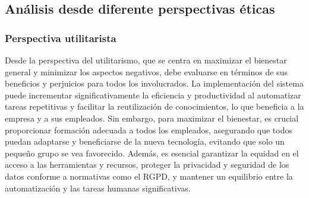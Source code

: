 \subsection{Análisis desde diferente perspectivas éticas}
\subsubsection{Perspectiva utilitarista}
Desde la perspectiva del utilitarismo, que se centra en maximizar el bienestar 
general y minimizar los aspectos negativos, debe evaluarse en términos de sus 
beneficios y perjuicios para todos los involucrados. La implementación del sistema 
puede incrementar significativamente la eficiencia 
y productividad al automatizar tareas repetitivas y facilitar la reutilización 
de conocimientos, lo que beneficia a la empresa y a sus empleados. Sin embargo, 
para maximizar el bienestar, es crucial proporcionar formación adecuada a todos 
los empleados, asegurando que todos puedan adaptarse y beneficiarse de la nueva 
tecnología, evitando que solo un pequeño grupo se vea favorecido. Además, es 
esencial garantizar la equidad en el acceso a las herramientas y recursos, proteger 
la privacidad y seguridad de los datos conforme a normativas como el RGPD, y 
mantener un equilibrio entre la automatización y las tareas humanas significativas. 

\pagebreak